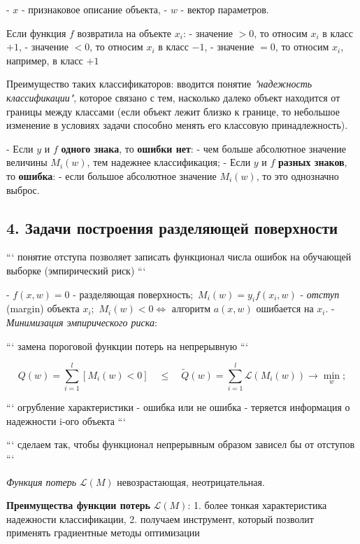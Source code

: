 - $x$ - признаковое описание объекта,
- $w$ - вектор параметров.

Если функция $f$ возвратила на объекте $x_i$:
- значение $> 0$, то относим $x_i$ в класс $+1$,
- значение $< 0$, то относим $x_i$ в класс $-1$,
- значение $= 0$, то относим $x_i$, например, в класс $+1$

Преимущество таких классификаторов: вводится понятие
\textit{"надежность классификации"}, которое связано с тем, насколько далеко объект
находится от границы между классами (если объект лежит близко к границе, то
небольшое изменение в условиях задачи способно менять его классовую
принадлежность).

- Если $y$ и $f$ \textbf{одного знака}, то \textbf{ошибки нет}:
    - чем больше абсолютное значение величины $M_i{(w)}$, тем надежнее
    классификация;
- Если $y$ и $f$ \textbf{разных знаков}, то \textbf{ошибка}:
    - если большое абсолютное значение $M_i{(w)}$, то это однозначно выброс.

\subsection{4. Задачи построения разделяющей поверхности}

```
понятие отступа позволяет записать функционал числа ошибок на обучающей
выборке (эмпирический риск)
```

- $f{\left( x, w \right)} = 0$ - разделяющая поверхность;\
$M_i{\left( w \right)} = y_i f{\left( x_i, w \right)}$ - \textit{отступ} (margin)
объекта $x_i$;\
$M_i{\left( w \right)} < 0 \iff$ алгоритм
$a{\left( x, w \right)}$ ошибается на $x_i$.
- \textit{Минимизация эмпирического риска}:

```
замена пороговой функции потерь на непрерывную
```

$$Q{(w)} = \sum_{i=1}^{l}{\left[ M_i{(w)} < 0 \right]} \quad \leqslant  \quad \widetilde{Q}{(w)} = \sum_{i=1}^{l}{\mathscr{L}{\left( M_i{(w)} \right)}} \rightarrow \min_w;$$

```
огрубление характеристики - ошибка или не ошибка - теряется информация о
надежности i-ого объекта
```

```
сделаем так, чтобы функционал непрерывным образом зависел бы от отступов
```

\textit{Функция потерь} $\mathscr{L}{(M)}$ невозрастающая, неотрицательная.

\textbf{Преимущества функции потерь} $\mathscr{L}{(M)}$:
1. более тонкая характеристика надежности классификации,
2. получаем инструмент, который позволит применять градиентные методы
оптимизации

